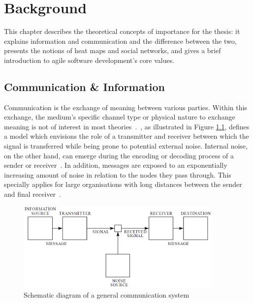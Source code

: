 \chapter{Background}
\label{chap:background}

This chapter describes the theoretical concepts of importance for the thesis: it explains information and communication and the difference between the two, presents the notions of heat maps and social networks, and gives a brief introduction to agile software development's core values.

\section{Communication \& Information}
\label{chap:background-comm-info}

Communication is the exchange of meaning between various parties. Within this exchange, the medium's specific channel type or physical nature to exchange meaning is not of interest in most theories~\citep{savage2011informationtheory}.~\citet{shannon1948theoryofcommunication}, as illustrated in Figure \ref{fig:communication-system}, defines a model which envisions the role of a transmitter and receiver between which the signal is transferred while being prone to potential external noise. Internal noise, on the other hand, can emerge during the encoding or decoding process of a sender or receiver~\citep{verdu1998informationtheory}.
In addition, messages are exposed to an exponentially increasing amount of noise in relation to the nodes they pass through. This specially applies for large organisations with long distances between the sender and final receiver~\citep{shannon1948theoryofcommunication}.

\begin{figure}[h!]
  \centering
  \includegraphics[width=0.90\textwidth]{figures/communication-information-shannon.png}
  \caption{Schematic diagram of a general communication system~\citep{shannon1948theoryofcommunication}}
  \label{fig:communication-system}
\end{figure}

